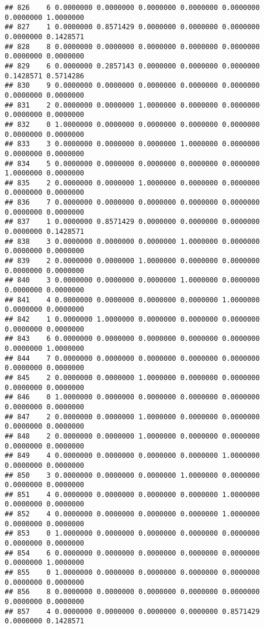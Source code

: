 \documentclass[
]{article}
\begin{document}
\begin{verbatim}
## 826    6 0.0000000 0.0000000 0.0000000 0.0000000 0.0000000 0.0000000 1.0000000
## 827    1 0.0000000 0.8571429 0.0000000 0.0000000 0.0000000 0.0000000 0.1428571
## 828    8 0.0000000 0.0000000 0.0000000 0.0000000 0.0000000 0.0000000 0.0000000
## 829    6 0.0000000 0.2857143 0.0000000 0.0000000 0.0000000 0.1428571 0.5714286
## 830    9 0.0000000 0.0000000 0.0000000 0.0000000 0.0000000 0.0000000 0.0000000
## 831    2 0.0000000 0.0000000 1.0000000 0.0000000 0.0000000 0.0000000 0.0000000
## 832    0 1.0000000 0.0000000 0.0000000 0.0000000 0.0000000 0.0000000 0.0000000
## 833    3 0.0000000 0.0000000 0.0000000 1.0000000 0.0000000 0.0000000 0.0000000
## 834    5 0.0000000 0.0000000 0.0000000 0.0000000 0.0000000 1.0000000 0.0000000
## 835    2 0.0000000 0.0000000 1.0000000 0.0000000 0.0000000 0.0000000 0.0000000
## 836    7 0.0000000 0.0000000 0.0000000 0.0000000 0.0000000 0.0000000 0.0000000
## 837    1 0.0000000 0.8571429 0.0000000 0.0000000 0.0000000 0.0000000 0.1428571
## 838    3 0.0000000 0.0000000 0.0000000 1.0000000 0.0000000 0.0000000 0.0000000
## 839    2 0.0000000 0.0000000 1.0000000 0.0000000 0.0000000 0.0000000 0.0000000
## 840    3 0.0000000 0.0000000 0.0000000 1.0000000 0.0000000 0.0000000 0.0000000
## 841    4 0.0000000 0.0000000 0.0000000 0.0000000 1.0000000 0.0000000 0.0000000
## 842    1 0.0000000 1.0000000 0.0000000 0.0000000 0.0000000 0.0000000 0.0000000
## 843    6 0.0000000 0.0000000 0.0000000 0.0000000 0.0000000 0.0000000 1.0000000
## 844    7 0.0000000 0.0000000 0.0000000 0.0000000 0.0000000 0.0000000 0.0000000
## 845    2 0.0000000 0.0000000 1.0000000 0.0000000 0.0000000 0.0000000 0.0000000
## 846    0 1.0000000 0.0000000 0.0000000 0.0000000 0.0000000 0.0000000 0.0000000
## 847    2 0.0000000 0.0000000 1.0000000 0.0000000 0.0000000 0.0000000 0.0000000
## 848    2 0.0000000 0.0000000 1.0000000 0.0000000 0.0000000 0.0000000 0.0000000
## 849    4 0.0000000 0.0000000 0.0000000 0.0000000 1.0000000 0.0000000 0.0000000
## 850    3 0.0000000 0.0000000 0.0000000 1.0000000 0.0000000 0.0000000 0.0000000
## 851    4 0.0000000 0.0000000 0.0000000 0.0000000 1.0000000 0.0000000 0.0000000
## 852    4 0.0000000 0.0000000 0.0000000 0.0000000 1.0000000 0.0000000 0.0000000
## 853    0 1.0000000 0.0000000 0.0000000 0.0000000 0.0000000 0.0000000 0.0000000
## 854    6 0.0000000 0.0000000 0.0000000 0.0000000 0.0000000 0.0000000 1.0000000
## 855    0 1.0000000 0.0000000 0.0000000 0.0000000 0.0000000 0.0000000 0.0000000
## 856    8 0.0000000 0.0000000 0.0000000 0.0000000 0.0000000 0.0000000 0.0000000
## 857    4 0.0000000 0.0000000 0.0000000 0.0000000 0.8571429 0.0000000 0.1428571

\end{verbatim}
\end{document}
